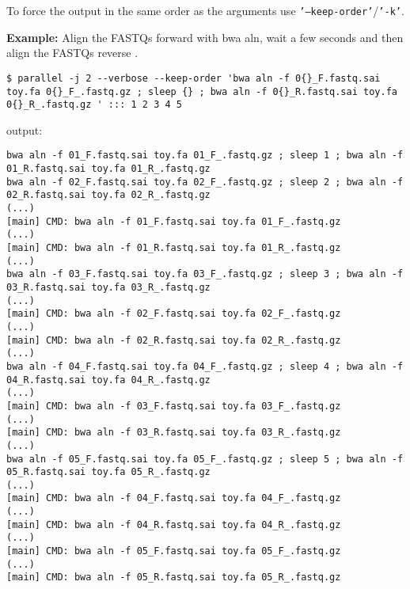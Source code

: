 \documentclass{article}
\newcommand{\example}[1]{
\textbf{Example: } {\color[rgb]{0,0,1} #1 } .
}
\newcommand{\cmdoption}[1]{\texttt{'#1'}}
\begin{document}
To force the output in the same order as the arguments use \cmdoption{--keep-order}/\cmdoption{-k}.
\example{Align the FASTQs forward with bwa aln, wait a few seconds and then align the FASTQs reverse }
\begin{lstlisting}
$ parallel -j 2 --verbose --keep-order 'bwa aln -f 0{}_F.fastq.sai toy.fa 0{}_F_.fastq.gz ; sleep {} ; bwa aln -f 0{}_R.fastq.sai toy.fa 0{}_R_.fastq.gz ' ::: 1 2 3 4 5
\end{lstlisting}
output:
\begin{lstlisting}
bwa aln -f 01_F.fastq.sai toy.fa 01_F_.fastq.gz ; sleep 1 ; bwa aln -f 01_R.fastq.sai toy.fa 01_R_.fastq.gz 
bwa aln -f 02_F.fastq.sai toy.fa 02_F_.fastq.gz ; sleep 2 ; bwa aln -f 02_R.fastq.sai toy.fa 02_R_.fastq.gz 
(...)
[main] CMD: bwa aln -f 01_F.fastq.sai toy.fa 01_F_.fastq.gz
(...)
[main] CMD: bwa aln -f 01_R.fastq.sai toy.fa 01_R_.fastq.gz
(...)
bwa aln -f 03_F.fastq.sai toy.fa 03_F_.fastq.gz ; sleep 3 ; bwa aln -f 03_R.fastq.sai toy.fa 03_R_.fastq.gz 
(...)
[main] CMD: bwa aln -f 02_F.fastq.sai toy.fa 02_F_.fastq.gz
(...)
[main] CMD: bwa aln -f 02_R.fastq.sai toy.fa 02_R_.fastq.gz
(...)
bwa aln -f 04_F.fastq.sai toy.fa 04_F_.fastq.gz ; sleep 4 ; bwa aln -f 04_R.fastq.sai toy.fa 04_R_.fastq.gz 
(...)
[main] CMD: bwa aln -f 03_F.fastq.sai toy.fa 03_F_.fastq.gz
(...)
[main] CMD: bwa aln -f 03_R.fastq.sai toy.fa 03_R_.fastq.gz
(...)
bwa aln -f 05_F.fastq.sai toy.fa 05_F_.fastq.gz ; sleep 5 ; bwa aln -f 05_R.fastq.sai toy.fa 05_R_.fastq.gz 
(...)
[main] CMD: bwa aln -f 04_F.fastq.sai toy.fa 04_F_.fastq.gz
(...)
[main] CMD: bwa aln -f 04_R.fastq.sai toy.fa 04_R_.fastq.gz
(...)
[main] CMD: bwa aln -f 05_F.fastq.sai toy.fa 05_F_.fastq.gz
(...)
[main] CMD: bwa aln -f 05_R.fastq.sai toy.fa 05_R_.fastq.gz
\end{lstlisting}
\end{document}
